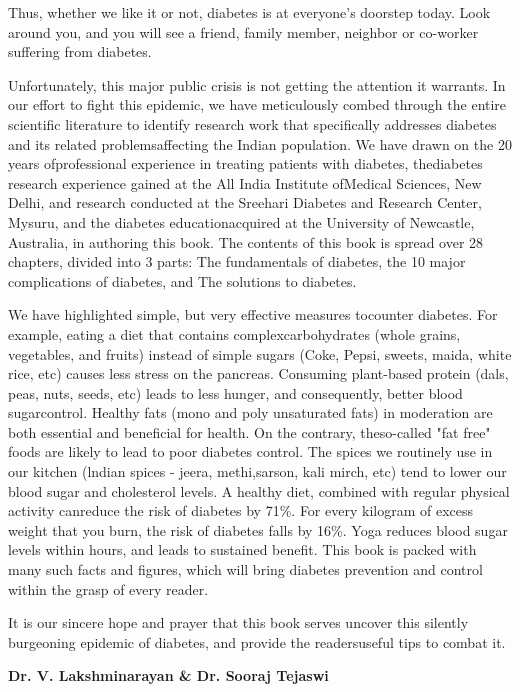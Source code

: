 Thus, whether we like it or not, diabetes is at everyone's doorstep today. Look around you, and you will see a friend, family member, neighbor or co-worker suffering from diabetes.

Unfortunately, this major public crisis is not getting the attention it warrants. In our effort to fight this epidemic, we have meticulously combed through the entire scientific literature to identify research work that specifically addresses diabetes and its related problems\break affecting the Indian population. We have drawn on the 20 years of\break professional experience in treating patients with diabetes, the\break diabetes research experience gained at the All India Institute of\break Medical Sciences, New Delhi, and research conducted at the Sreehari Diabetes and Research Center, Mysuru, and the diabetes education\break acquired at the University of Newcastle, Australia, in authoring this book. The contents of this book is spread over 28 chapters, divided into 3 parts: The fundamentals of diabetes, the 10 major complications of diabetes, and The solutions to diabetes.

We have highlighted simple, but very effective measures to\break counter diabetes. For example, eating a diet that contains complex\break carbohydrates (whole grains, vegetables, and fruits) instead of simple sugars (Coke, Pepsi, sweets, maida, white rice, etc) causes less stress on the pancreas. Consuming plant-based protein (dals, peas, nuts, seeds, etc) leads to less hunger, and consequently, better blood sugar\break control. Healthy fats (mono and poly unsaturated fats) in moderation are both essential and beneficial for health. On the contrary, the\break so-called "fat free" foods are likely to lead to poor diabetes control. The spices we routinely use in our kitchen (lndian spices - jeera, methi,\break sarson, kali mirch, etc) tend to lower our blood sugar and cholesterol levels. A healthy diet, combined with regular physical activity can\break reduce the risk of diabetes by 71\%. For every kilogram of excess weight that you burn, the risk of diabetes falls by 16\%. Yoga reduces blood sugar levels within hours, and leads to sustained benefit. This book is packed with many such facts and figures, which will bring diabetes prevention and control within the grasp of every reader.

It is our sincere hope and prayer that this book serves uncover this silently burgeoning epidemic of diabetes, and provide the readers\break useful tips to combat it.

\begin{flushright}
\textbf{Dr. V. Lakshminarayan \& Dr. Sooraj Tejaswi}
\end{flushright}


\newpage
~\phantom{a}
\thispagestyle{empty}
\newpage
